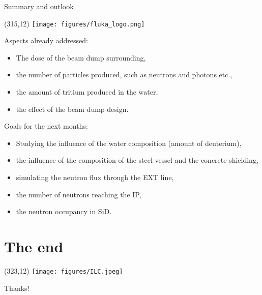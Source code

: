 \documentclass[xcolor={dvipsnames}]{beamer}
\newcommand{\ilclogo}{
  \setlength{\TPHorizModule}{1pt}
  \setlength{\TPVertModule}{1pt}
  \begin{textblock}{1}(323,12)
   \texttt{[image: figures/ILC.jpeg]}
  \end{textblock}
}
\newcommand{\flukalogo}{
  \setlength{\TPHorizModule}{1pt}
  \setlength{\TPVertModule}{1pt}
  \begin{textblock}{1}(315,12)
   \texttt{[image: figures/fluka\_logo.png]}
  \end{textblock}
}
\begin{document}
\begin{frame}{Summary and outlook}
 \flukalogo
 Aspects already addressed:
\begin{itemize}
 \item The dose of the beam dump surrounding,
 \item the number of particles produced, such as neutrons and photons etc.,
 \item the amount of tritium produced in the water,
 \item the effect of the beam dump design.
\end{itemize}
\vspace*{0.2cm}
 Goals for the next months:
\begin{itemize}
 \item Studying the influence of the water composition (amount of deuterium),
 \item the influence of the composition of the steel vessel and the concrete shielding,
 \item simulating the neutron flux through the EXT line,
 \item the number of neutrons reaching the IP,
 \item the neutron occupancy in SiD.
\end{itemize}
\end{frame}


\section*{The end}
{
\begin{frame}
\ilclogo
\begin{center}
\textcolor{RubineRed}{
	\LARGE Thanks!\\
}
\end{center}
\end{frame}
}
\end{document}
